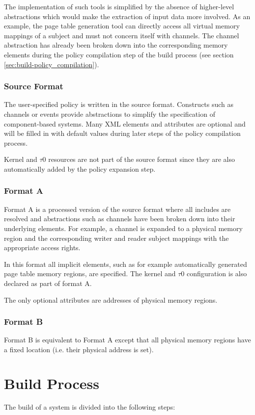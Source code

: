 \documentclass[a4paper,twoside,titlepage]{article}
\begin{document}
The implementation of such tools is simplified by the absence of higher-level
abstractions which would make the extraction of input data more involved. As
an example, the page table generation tool can directly access all virtual
memory mappings of a subject and must not concern itself with channels. The
channel abstraction has already been broken down into the corresponding memory
elements during the policy compilation step of the build process (see
section \ref{sec:build-policy_compilation}).

\subsubsection{Source Format}
The user-specified policy is written in the source format. Constructs such as
channels or events provide abstractions to simplify the specification of
component-based systems. Many XML elements and attributes are optional and will
be filled in with default values during later steps of the policy compilation
process.

Kernel and $\tau$0 resources are not part of the source format since they are also
automatically added by the policy expansion step.

\subsubsection{Format A}
Format A is a processed version of the source format where all includes are
resolved and abstractions such as channels have been broken down into their
underlying elements. For example, a channel is expanded to a physical memory
region and the corresponding writer and reader subject mappings with the
appropriate access rights.

In this format all implicit elements, such as for example automatically
generated page table memory regions, are specified. The kernel and $\tau$0
configuration is also declared as part of format A.

The only optional attributes are addresses of physical memory regions.

\subsubsection{Format B}
Format B is equivalent to Format A except that all physical memory regions have
a fixed location (i.e. their physical address is set).

\section{Build Process}
The build of a system is divided into the following steps:
\end{document}
